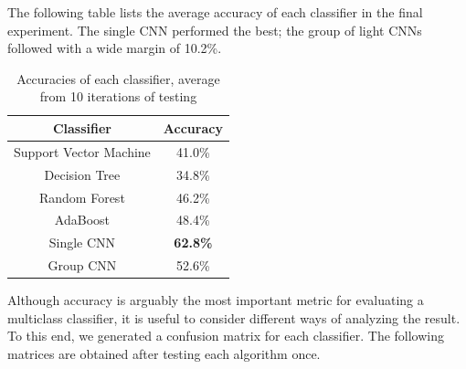 \documentclass[11pt]{article}
\begin{document}
	The following table lists the average accuracy of each classifier in the final experiment. The single CNN performed the best; the group of light CNNs followed with a wide margin of 10.2\%.
	
	
	\begin{table}[!htbp]
\centering
\caption{Accuracies of each classifier, average from 10 iterations of testing}
\label{my-label2}
\begin{tabular}{|c|c|}
\hline
Classifier             & Accuracy \\ \hline
Support Vector Machine &    41.0\%      \\ \hline
Decision Tree          &   34.8\%       \\ \hline
Random Forest          &  46.2\%        \\ \hline
AdaBoost               & 48.4\%          \\ \hline
Single CNN             &  \textbf{62.8\%}         \\ \hline
Group CNN              &  52.6\%        \\ \hline
\end{tabular}
\end{table}

Although accuracy is arguably the most important metric for evaluating a multiclass classifier, it is useful to consider different ways of analyzing the result. To this end, we generated a confusion matrix for each classifier. The following matrices are obtained after testing each algorithm once.
\end{document}
